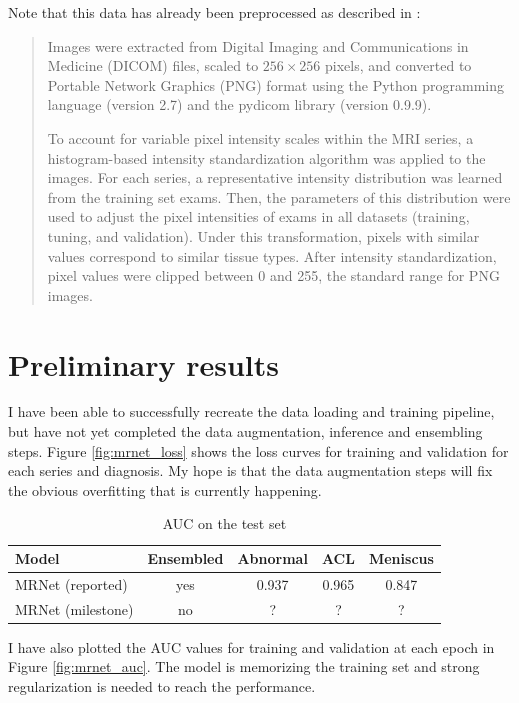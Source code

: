 \documentclass[10pt,twocolumn,letterpaper]{article}
\begin{document}
Note that this data has already been preprocessed as described in \cite{bien2018deep}:
\begin{quotation}
\noindent
   Images were extracted from Digital Imaging and Communications in Medicine
   (DICOM) files, scaled to $256 \times 256$ pixels, and converted to Portable Network
   Graphics (PNG) format using the Python programming language (version 2.7)
   and the pydicom library (version 0.9.9).

   To account for variable pixel intensity scales within the MRI series, a
   histogram-based intensity standardization algorithm was applied to the images.
   For each series, a representative intensity distribution was learned from the
   training set exams. Then, the parameters of this distribution were used to
   adjust the pixel intensities of exams in all datasets (training, tuning, and
   validation). Under this transformation, pixels with similar values correspond
   to similar tissue types. After intensity standardization, pixel values were
   clipped between 0 and 255, the standard range for PNG images.
\end{quotation}
\section{Preliminary results}

I have been able to successfully recreate the data loading and training pipeline,
but have not yet completed the data augmentation, inference and ensembling steps.
Figure \ref{fig:mrnet_loss} shows the loss curves for training and validation
for each series and diagnosis. My hope is that the data augmentation steps will
fix the obvious overfitting that is currently happening.

\begin{table}
\begin{center}
\begin{tabular}{|lc|c|c|c|}
\hline
Model & Ensembled & Abnormal & ACL & Meniscus \\
\hline\hline
MRNet (reported) & yes & 0.937 & 0.965 & 0.847 \\
MRNet (milestone)& no & ? & ? & ? \\
\hline
\end{tabular}
\end{center}
\caption{AUC on the test set}
\label{tab:results}
\end{table}

I have also plotted the AUC values for training and validation at each
epoch in Figure \ref{fig:mrnet_auc}. The model is memorizing the
training set and strong regularization is needed to reach the performance.
\end{document}
